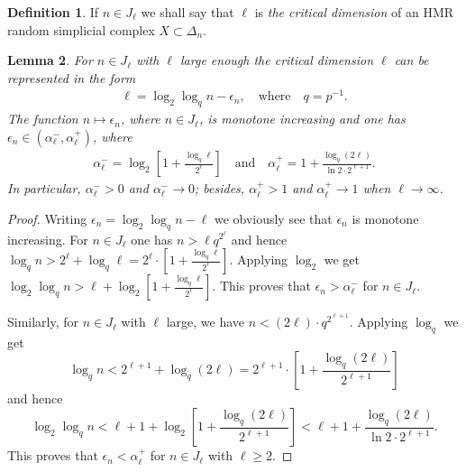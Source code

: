 \documentclass[11pt,twoside, reqno]{amsart}
\theoremstyle{plain}
\newtheorem{lema}{Lemma}
\newtheorem{corollary}[lema]{Corollary}
\theoremstyle{definition}
\newtheorem{definition}[lema]{Definition}
\begin{document}
\begin{definition}
If $n\in J_\ell$ we shall say that $\ell$ is {\it the critical dimension} of an HMR random simplicial complex $X\subset \Delta_n$. 
\end{definition}


\begin{lema}\label{lm:22}
For $n\in J_\ell$ with $\ell$ large enough the critical dimension $\ell$ can be represented in the form 
\begin{eqnarray}\label{eq:19b}
\ell=\log_2\log_q n  -\epsilon_n, \quad \mbox{where}\quad q=p^{-1}.\end{eqnarray} 
The function $n\mapsto \epsilon_n$, where $n\in J_\ell$, is monotone increasing and one has 
$\epsilon_n\in (\alpha_\ell^-,\alpha_\ell^+)$, where 
\begin{eqnarray*}
\alpha_\ell^-=\log_2\left[1+\frac{\log_q\ell}{2^\ell}\right]\quad \mbox{and}\quad 
\alpha_\ell^+ = 1+ \frac{\log_q(2\ell)}{\ln 2 \cdot 2^{\ell+1}}.
\end{eqnarray*}
In particular, $\alpha^-_\ell>0$ and $\alpha^-_\ell\to 0$; besides, 
$\alpha^+_\ell>1$ and $\alpha^+_\ell\to 1$ when $\ell\to \infty$. 
\end{lema}
\begin{proof} Writing $\epsilon_n=\log_2\log_qn-\ell$ we obviously see that $\epsilon_n$ is monotone increasing. For $n\in J_\ell$ one has $n>\ell q^{2^{\ell}}$
and hence $\log_qn >2^\ell+ \log_q\ell= 2^\ell\cdot \left[1+\frac{\log_q\ell}{2^\ell}\right]$. Applying $\log_2$ we get 
$\log_2\log_qn>\ell +\log_2\left[1+\frac{\log_q\ell}{2^\ell}\right]$. This proves that $\epsilon_n>\alpha_\ell^-$ for $n\in J_\ell$. 

Similarly, for $n\in J_\ell$ with $\ell$ large,
we have $n<(2\ell)\cdot q^{2^{\ell+1}}$. Applying $\log_q$ we get 
$$
\log_q n<2^{\ell+1} +\log_q(2\ell)= 2^{\ell+1}\cdot \left[1+ \frac{\log_q(2\ell)}{2^{\ell+1}}\right]
$$
and hence
$$
\log_2\log_q n < \ell+1 + \log_2\left[1+ \frac{\log_q(2\ell)}{2^{\ell+1}}\right] < \ell+1 +\frac{\log_q(2\ell)}{\ln 2\cdot 2^{\ell+1}}.
$$
This proves that $\epsilon_n<\alpha_\ell^+$ for $n\in J_\ell$ with $\ell\ge 2$. 
\end{proof}
%
%
%
%
\end{document}
